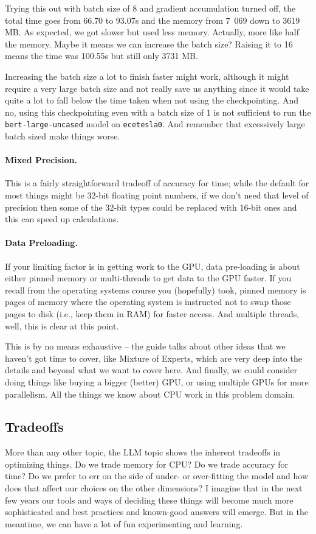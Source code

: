 Trying this out with batch size of 8 and gradient accumulation turned off, the total time goes from 66.70 to 93.07s and the memory from 7~069 down to 3619 MB. As expected, we got slower but used less memory. Actually, more like half the memory. Maybe it means we can increase the batch size? Raising it to 16 means the time was  100.55s but still only 3731 MB.

Increasing the batch size a lot to finish faster might work, although it might require a very large batch size and not really save us anything since it would take quite a lot to fall below the time taken when not using the checkpointing. And no, using this checkpointing even with a batch size of 1 is not sufficient to run the \texttt{bert-large-uncased} model on \texttt{ecetesla0}. And remember that excessively large batch sized make things worse.

\paragraph{Mixed Precision.} This is a fairly straightforward tradeoff of accuracy for time; while the default for most things might be 32-bit floating point numbers, if we don't need that level of precision then some of the 32-bit types could be replaced with 16-bit ones and this can speed up calculations. 

\paragraph{Data Preloading.} If your limiting factor is in getting work to the GPU, data pre-loading is about either pinned memory or multi-threads to get data to the GPU faster. If you recall from the operating systems course you (hopefully) took, pinned memory is pages of memory where the operating system is instructed not to swap those pages to disk (i.e., keep them in RAM) for faster access. And multiple threads, well, this is clear at this point. 

This is by no means exhaustive -- the guide talks about other ideas that we haven't got time to cover, like Mixture of Experts, which are very deep into the details and beyond what we want to cover here. And finally, we could consider doing things like buying a bigger (better) GPU, or using multiple GPUs for more parallelism. All the things we know about CPU work in this problem domain. 

\subsection*{Tradeoffs}

More than any other topic, the LLM topic shows the inherent tradeoffs in optimizing things. Do we trade memory for CPU? Do we trade accuracy for time? Do we prefer to err on the side of under- or over-fitting the model and how does that affect our choices on the other dimensions? I imagine that in the next few years our tools and ways of deciding these things will become much more sophisticated and best practices and known-good answers will emerge. But in the meantime, we can have a lot of fun experimenting and learning.




